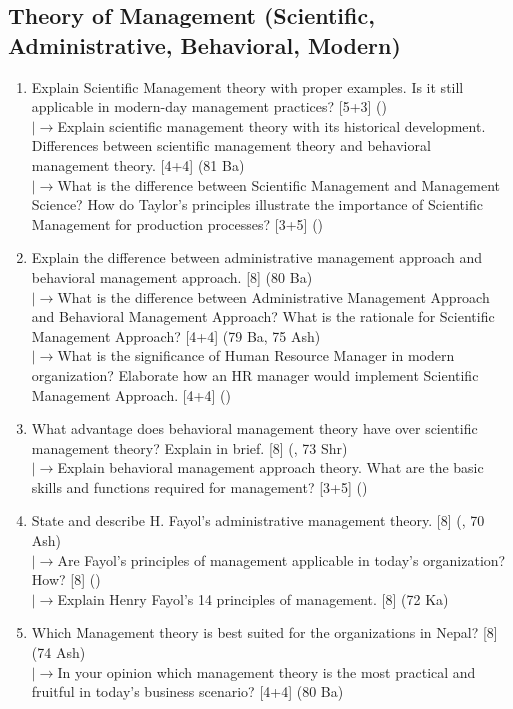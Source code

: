 \documentclass[12pt]{article}
\newcommand{\lb}{\\$\left|\rightarrow\right.$}
\begin{document}
  \subsection{Theory of Management (Scientific, Administrative, Behavioral, Modern)}
    \begin{enumerate}[topsep=0pt, noitemsep]
      \item Explain Scientific Management theory with proper examples. Is it still applicable in modern-day management practices? \hfill [5+3] ()
        \lb Explain scientific management theory with its historical development. Differences between scientific management theory and behavioral management theory. \hfill [4+4] (81 Ba)
        \lb What is the difference between Scientific Management and Management Science? How do Taylor's principles illustrate the importance of Scientific Management for production processes? \hfill [3+5] ()

      \item Explain the difference between administrative management approach and behavioral management approach. \hfill [8] (80 Ba)
        \lb What is the difference between Administrative Management Approach and Behavioral Management Approach? What is the rationale for Scientific Management Approach? \hfill [4+4] (79 Ba, 75 Ash)
        \lb What is the significance of Human Resource Manager in modern organization? Elaborate how an HR manager would implement Scientific Management Approach. \hfill [4+4] ()

      \item What advantage does behavioral management theory have over scientific management theory? Explain in brief. \hfill [8] (, 73 Shr)
        \lb Explain behavioral management approach theory. What are the basic skills and functions required for management? \hfill [3+5] ()

      \item State and describe H. Fayol's administrative management theory. \hfill [8] (, 70 Ash)
        \lb Are Fayol's principles of management applicable in today's organization? How? \hfill [8] ()
        \lb Explain Henry Fayol's 14 principles of management. \hfill [8] (72 Ka)

      \item Which Management theory is best suited for the organizations in Nepal? \hfill [8] (74 Ash)
        \lb In your opinion which management theory is the most practical and fruitful in today's business scenario? \hfill [4+4] (80 Ba)
    \end{enumerate}
\end{document}
